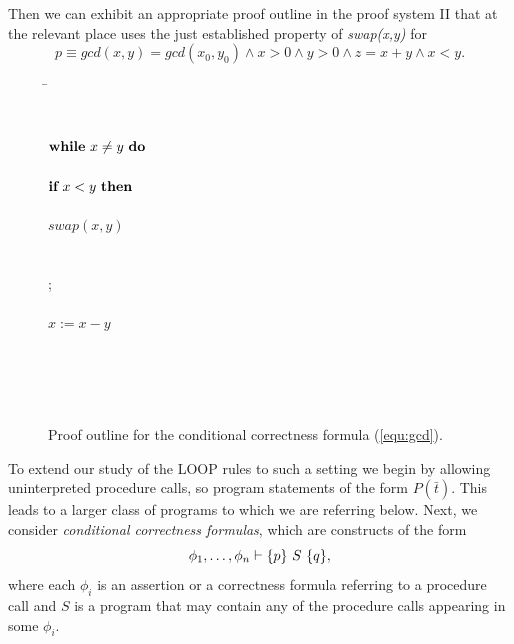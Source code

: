 \documentclass[manuscript, screen, review]{acmart}
\begin{document}
Then we can exhibit an appropriate proof outline in the proof
system II that at the relevant place uses the just established property of 
\emph{swap(x,y)} for 
\[
  p \equiv gcd(x,y)=gcd(x_0, y_0)  \wedge x>0 \wedge y>0 \wedge z = x+y \wedge x < y.
\]
 \begin{figure}[ht]
 \begin{tabbing}
 \qquad\qquad                                       
\=  \\
\>  \\
\>      \\
\> $\mbox{$\mbox{{\bf while}\ } {x \neq y}\ \mbox{{\bf do}\ }$}$                          \\
\>  \qquad {} \\
\>  \qquad $\mbox{{\bf if}\ } x < y \mbox{\ {\bf then}\ }$                         \\
\> \qquad \qquad {} \\
\>  \qquad \qquad  $swap(x,y) $                         \\
\> \qquad \qquad {} \\
\> \qquad \qquad {} \\
\>  \qquad \FI; \\
\>  \qquad {} \\
\>  \qquad $x:= x-y$                         \\
\>  \qquad {} \\
\>  \OD                                      \\
\>  \\
\>  \\
\>  
\end{tabbing}
\caption{Proof outline for the conditional correctness formula (\ref{equ:gcd}).}
\label{fig:gcd}

\end{figure}


To extend our study of the LOOP rules to such a setting we
begin by allowing uninterpreted procedure calls, so program statements
of the form $P(\bar{t})$. This leads to a larger class of programs to
which we are referring below. Next, we consider \emph{conditional
  correctness formulas}, which are constructs of the form
\[
\phi_1, \dots, \phi_n \vdash \mbox{$\{{p}\}\ {S}\ \{{q}\}$},
\]
where each $\phi_i$ is an assertion or a correctness formula referring
to a procedure call and $S$ is a program that may contain any of the
procedure calls appearing in some $\phi_i$.
\end{document}
